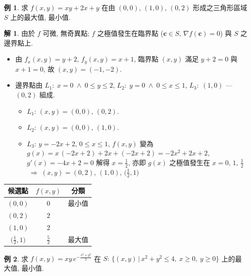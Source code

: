 \documentclass[12pt]{extarticle}
\newcommand{\ds}{\displaystyle}
\newcommand{\ie}{\;\Longrightarrow\;}
\newcommand{\andd}{\;\wedge\;}
\theoremstyle{definition}
\newtheorem*{ex}{例}
\newtheorem*{sol}{解}
\newcommand{\vc}{\mathbf{c}}
\begin{document}
\begin{ex}
  求 $\ds f(x, y) = xy + 2x + y$ 在由 $(0, 0)$, $(1, 0)$, $(0, 2)$ 形成之三角形區域 $S$ 上的最大值, 最小值. 
\end{ex}

\begin{sol}
  由於 $f$ 可微, 無奇異點; $f$ 之極值發生在臨界點 ($\vc\in S,\,\nabla f(\vc) = 0$) 與 $S$ 之邊界點上. 
  \begin{itemize}\setlength\itemsep{0em}
    \item 由 $\ds f_x(x, y) = y + 2$, $\ds f_y(x, y) = x + 1$, 臨界點 $(x, y)$ 滿足 $\ds y + 2 = 0$ 與 $\ds x + 1 = 0$, 故 $(x, y) = (-1, -2)$. 
    \item 邊界點由 $L_1:\;x = 0\andd 0\leqslant y\leqslant 2$, $L_2:\;y = 0\andd 0\leqslant x\leqslant 1$, $L_3:\;(1, 0)$ --- $(0, 2)$ 組成. 
      \begin{itemize}\setlength\itemsep{0em}
        \item $L_1$: $(x, y) = (0, 0),\,(0, 2)$. 
        \item $L_2$: $(x, y) = (0, 0),\,(1, 0)$. 
        \item $L_3$: $y = -2 x + 2$, $0\leqslant x\leqslant 1$, $f(x, y)$ 變為 $g(x) = x\,(-2x + 2) + 2x + (-2x + 2) = -2x^2 + 2x + 2$, $g'(x) = -4x + 2 = 0$ 解得 $x = \frac{1}{2}$, 亦即 $g(x)$ 之極值發生在 $x = 0,\,1,\,\frac{1}{2}$ $\ie (x, y) = (0, 2),\,(1, 0),\,\big(\frac{1}{2}, 1\big)$ 
      \end{itemize}
  \end{itemize}
  \begin{center}
  \renewcommand{\arraystretch}{1.3}
  \begin{tabular}{ccc}
    \toprule
    候選點 & $f(x, y)$ & 分類 \\    
    \midrule
    $(0, 0)$ & $0$ & 最小值 \\
    $(0, 2)$ & $2$ &  \\
    $(1, 0)$ & $2$ &  \\
    $\big(\frac{1}{2}, 1\big)$  & $\frac{5}{2}$ & 最大值 \\ 
    \bottomrule
  \end{tabular}
  \renewcommand{\arraystretch}{1.0}
  \end{center}
\end{sol}

\begin{ex}
  求 $\ds f(x, y) = xy\,e^{-\frac{x^2 + y^2}{2}}$ 在 $\ds S:\,\big\{(x, y)\,|\,x^2 + y^2\leqslant 4,\ x\geqslant 0,\ y\geqslant 0\big\}$ 上的最大值, 最小值. 
\end{ex}
\end{document}
